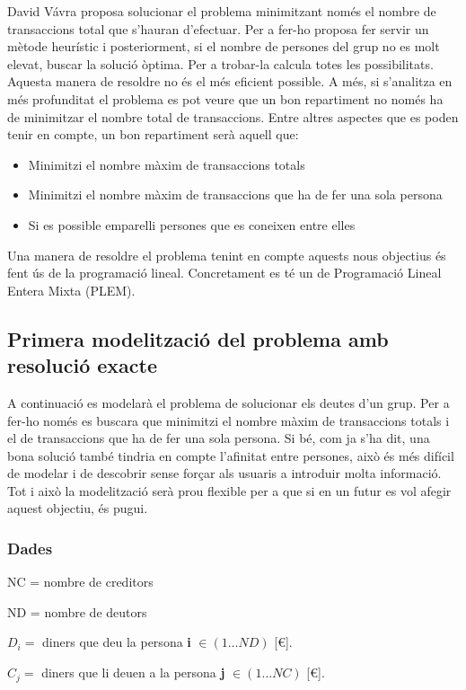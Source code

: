 David Vávra proposa solucionar el problema minimitzant només el nombre de transaccions total que s'hauran d'efectuar. Per a fer-ho proposa fer servir un mètode heurístic i posteriorment, si el nombre de persones del grup no es molt elevat, buscar la solució òptima. Per a trobar-la calcula totes les possibilitats. Aquesta manera de resoldre no és el més eficient possible. A més, si s'analitza en més profunditat el problema es pot veure que un bon repartiment no només ha de minimitzar el nombre total de transaccions. Entre altres aspectes que es poden tenir en compte, un bon repartiment serà aquell que:

\begin{itemize}
\item Minimitzi el nombre màxim de transaccions totals
\item Minimitzi el nombre màxim de transaccions que ha de fer una sola persona
\item Si es possible emparelli persones que es coneixen entre elles
\end{itemize}

Una manera de resoldre el problema tenint en compte aquests nous objectius és fent ús de la programació lineal. Concretament es té un de Programació Lineal Entera Mixta (PLEM).

\subsection{Primera modelització del problema amb resolució exacte}
A continuació es modelarà el problema de solucionar els deutes d'un grup. Per a fer-ho només es buscara que minimitzi el nombre màxim de transaccions totals i el de transaccions que ha de fer una sola persona. Si bé, com ja s'ha dit, una bona solució també tindria en compte l'afinitat entre persones, això és més difícil de modelar i de descobrir sense forçar als usuaris a introduir molta informació. Tot i això la modelització serà prou flexible per a que si en un futur es vol afegir aquest objectiu, és pugui. 
\subsubsection{Dades}
\begin{description}
\item NC = nombre de creditors
\item ND = nombre de deutors
\item $D_{i}=$ diners que deu la persona \textbf{i} $\in (1 \ldots ND)$  [€].
\item $C_{j}=$ diners que li deuen a la persona \textbf{j} $\in (1 \ldots NC)$  [€].
\end{description}



